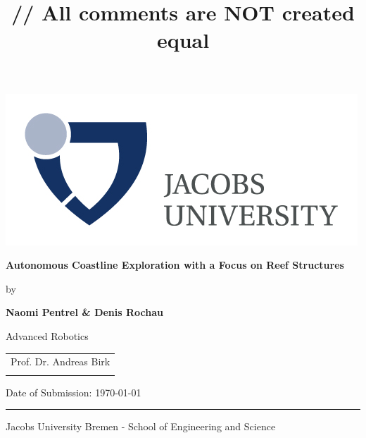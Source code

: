 \documentclass[twoside, 12pt]{article}
\title{\vspace{-15mm}\fontsize{24pt}{10pt}\selectfont\textbf{// All comments are NOT created equal}} %
\begin{document}
\thispagestyle{empty}
\begin{flushright}
    \includegraphics[scale=1.0]{assets/Logo}
  \end{flushright}
  \vspace{20mm}
  \begin{center}
    \huge
    \textbf{Autonomous Coastline Exploration with a Focus on Reef Structures}
  \end{center}
  \vspace*{4mm}
  \begin{center}
   \Large by
  \end{center}
  \vspace*{4mm}
  \begin{center}
    \Large
    \textbf{Naomi Pentrel \& Denis Rochau}
  \end{center}
  \vspace*{20mm}
  \begin{center}
    \large
    Advanced Robotics
  \end{center}
  \vfill
  \begin{flushright}
    \large
    \begin{tabular}{l}
      
      \hline
      Prof. Dr. Andreas Birk\\
      \\
    \end{tabular}
  \end{flushright}
  \vspace*{8mm}
  \begin{flushleft}
    \large
    Date of Submission: \today \\
    \rule{\textwidth}{1pt}
  \end{flushleft}
  \begin{center}
    \Large Jacobs University Bremen - School of Engineering and Science
  \end{center}

\newpage
\end{document}
